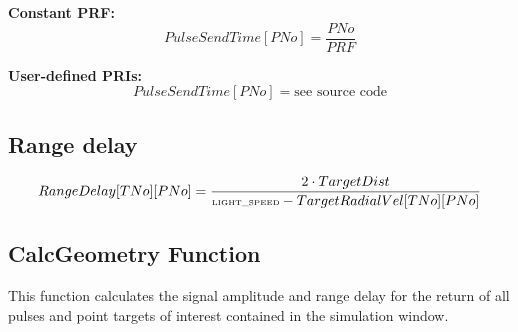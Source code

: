 \textbf{Constant PRF:}\emph{\ } 
\begin{equation}
PulseSendTime[PNo]=\frac{PNo}{PRF}
\end{equation}

\textbf{User-defined PRIs:}\emph{\ } 
\begin{equation}
PulseSendTime[PNo]=\text{see source code}
\end{equation}

\subsection{Range delay}

\begin{equation}
RangeDelay[TNo][PNo]=\frac{2\cdot TargetDist}{\text{{\tiny LIGHT\_SPEED}}%
-TargetRadialVel[TNo][PNo]}
\end{equation}

\subsection{CalcGeometry Function}

This function calculates the signal amplitude and range delay for the return
of all pulses and point targets of interest contained in the simulation
window.

